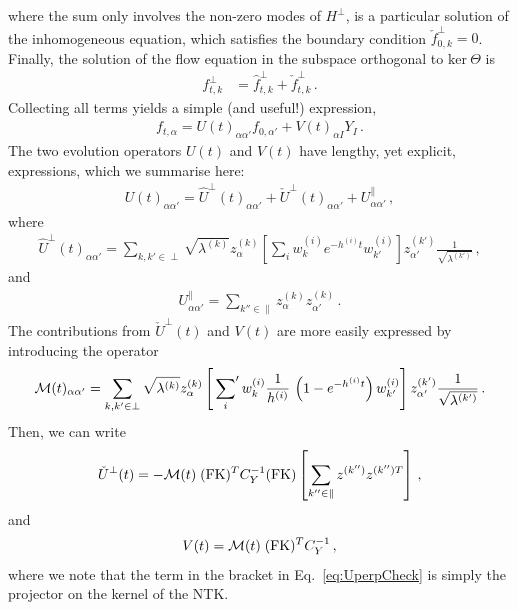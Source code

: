 where the sum only involves the non-zero modes of $H^\perp$,
is a particular solution of the inhomogeneous equation, which satisfies the boundary
condition $\check{f}^{\perp}_{0,k}=0$. Finally, the solution of the flow equation in the subspace orthogonal to
$\text{ker}\ \Theta$ is
\begin{align}
    f^\perp_{t,k}
    \label{eq:FlowSolution}
        &= \hat{f}^\perp_{t,k} + \check{f}^\perp_{t,k}
        \, .
\end{align}
Collecting all terms yields a simple (and useful!) expression,
\begin{align}
    \label{eq:AnalyticSol}
    f_{t,\alpha}
        = U(t)_{\alpha\alpha'} f_{0,\alpha'} + V(t)_{\alpha I} Y_{I}\, .
\end{align}
The two evolution operators $U(t)$ and $V(t)$ have lengthy, yet explicit, expressions, which we
summarise here: 
\begin{align}
    U(t)_{\alpha\alpha'} = \hat{U}^\perp(t)_{\alpha\alpha'}
        + \check{U}^\perp(t)_{\alpha\alpha'} + U^\parallel_{\alpha\alpha'}\, ,
\end{align}
where
\begin{align}
    \hat{U}^\perp(t)_{\alpha\alpha'}
        = \sum_{k,k'\in\perp} \sqrt{\lambda^{(k)}} z^{(k)}_\alpha 
            \left[\sum_i w^{(i)}_{k} e^{-h^{(i)}t} w^{(i)}_{k'}\right]
            z^{(k')}_{\alpha'} \frac{1}{\sqrt{\lambda^{(k')}}}\, ,
\end{align}
and
\begin{align}
    U^\parallel_{\alpha\alpha'}
        = \sum_{k''\in\parallel} z^{(k)}_\alpha z^{(k)}_{\alpha'} \, .
\end{align}
The contributions from $\check{U}^\perp(t)$ and $V(t)$ are more easily expressed by
introducing the operator
\begin{align}
    \label{eq:MOperatorDef}
    \mathcal{M}(t)_{\alpha\alpha'} 
        = \sum_{k,k'\in\perp} \sqrt{\lambda^{(k)}} z^{(k)}_\alpha 
            \left[\sideset{}{'}\sum_{i} w^{(i)}_{k} \frac{1}{h^{(i)}}\, 
            \left( 1- e^{-h^{(i)}t}\right) w^{(i)}_{k'}\right]
            z^{(k')}_{\alpha'} \frac{1}{\sqrt{\lambda^{(k')}}}\,. 
\end{align}
Then, we can write
\begin{align}
    \label{eq:UperpCheck}
    \check{U}^\perp(t)
        = - \mathcal{M}(t)\; (\mathrm{FK})^T C_Y^{-1} (\mathrm{FK}) 
            \left[\sum_{k''\in\parallel} z^{(k'')} z^{(k'') T}\right]\, ,
\end{align}
and
\begin{align}
    V(t) = \mathcal{M}(t)\; (\mathrm{FK})^T C_Y^{-1}\, ,
\end{align}
where we note that the term in the bracket in Eq.~\eqref{eq:UperpCheck} is simply the projector on the 
kernel of the NTK. 


